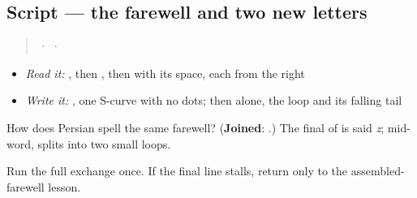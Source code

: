 \subsection*{Script — the farewell and two new letters}
\begin{quote}
 ·  ·  
\end{quote}

\begin{itemize}
\raggedright
  \item \emph{Read it:} \textbf{}, then \textbf{}, then \textbf{ } with its space, each from the right
  \item \emph{Write it:} \textbf{}, one S-curve with no dots; then \textbf{} alone, the loop and its falling tail
\end{itemize}

How does Persian spell the same farewell? (\textbf{Joined}: \textbf{}.) The final \textbf{} of \textbf{} is said \emph{z}; mid-word, \textbf{} splits into two small loops.

\begin{tcolorbox}[breakable,colback=teal!4,colframe=teal!35!black,title={Before you move on}]
Run the full exchange once. If the final line stalls, return only to the assembled-farewell lesson.
\end{tcolorbox}
